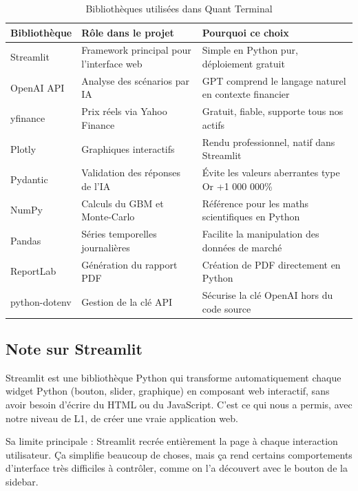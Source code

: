 \documentclass[a4paper, 12pt, twoside]{article}
\begin{document}
\begin{table}[h]
\begin{center}
\begin{tabular}{|l|p{5.5cm}|p{4cm}|}
\hline
\textbf{Bibliothèque} & \textbf{Rôle dans le projet} & \textbf{Pourquoi ce choix} \\
\hline
Streamlit & Framework principal pour l'interface web & Simple en Python pur, déploiement gratuit \\
\hline
OpenAI API & Analyse des scénarios par IA & GPT comprend le langage naturel en contexte financier \\
\hline
yfinance & Prix réels via Yahoo Finance & Gratuit, fiable, supporte tous nos actifs \\
\hline
Plotly & Graphiques interactifs & Rendu professionnel, natif dans Streamlit \\
\hline
Pydantic & Validation des réponses de l'IA & Évite les valeurs aberrantes type Or +1 000 000\% \\
\hline
NumPy & Calculs du GBM et Monte-Carlo & Référence pour les maths scientifiques en Python \\
\hline
Pandas & Séries temporelles journalières & Facilite la manipulation des données de marché \\
\hline
ReportLab & Génération du rapport PDF & Création de PDF directement en Python \\
\hline
python-dotenv & Gestion de la clé API & Sécurise la clé OpenAI hors du code source \\
\hline
\end{tabular}
\end{center}
\caption{Bibliothèques utilisées dans Quant Terminal}
\end{table}

\subsection{Note sur Streamlit}

Streamlit est une bibliothèque Python qui transforme automatiquement chaque widget
Python (bouton, slider, graphique) en composant web interactif, sans avoir besoin
d'écrire du HTML ou du JavaScript. C'est ce qui nous a permis, avec notre niveau de
L1, de créer une vraie application web.

Sa limite principale : Streamlit recrée entièrement la page à chaque interaction
utilisateur. Ça simplifie beaucoup de choses, mais ça rend certains comportements
d'interface très difficiles à contrôler, comme on l'a découvert avec le bouton
de la sidebar.
\end{document}
